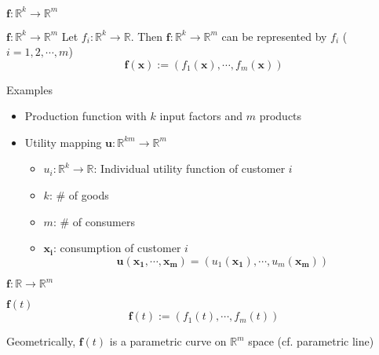 \documentclass[final]{beamer}
\begin{document}
\begin{frame}[t]{$\mathbf{f}:\mathbb{R}^k\rightarrow\mathbb{R}^m$}
	\begin{block}
		{$\mathbf{f}:\mathbb{R}^k\rightarrow\mathbb{R}^m$}
		Let $f_i: \mathbb{R}^k\rightarrow\mathbb{R}$. Then $\mathbf{f}:\mathbb{R}^k\rightarrow\mathbb{R}^m$ can be represented by $f_i$ ($i=1,2,\cdots,m$)
		\[
			\mathbf{f(x)}:=(f_1(\mathbf{x}),\cdots,f_m(\mathbf{x}))
		\]
	\end{block}
	\begin{block}
		{Examples}
		\begin{itemize}
			\item Production function with $k$ input factors and $m$ products
			\item Utility mapping $\mathbf{u}: \mathbb{R}^{km}\rightarrow\mathbb{R}^m$
			\begin{itemize}
				\item $u_i:\mathbb{R}^k\rightarrow\mathbb{R}$: Individual utility function of customer $i$
				\item $k$: \# of goods
				\item $m$: \# of consumers
				\item $\mathbf{x_i}$: consumption of customer $i$
				\[
					\mathbf{u}(\mathbf{x_1},\cdots,\mathbf{x_m})=(u_1(\mathbf{x_1}),\cdots,u_m(\mathbf{x_m}))
				\]
			\end{itemize}
		\end{itemize}
	\end{block}
\end{frame}
\begin{frame}[t]{$\mathbf{f}:\mathbb{R}\rightarrow\mathbb{R}^m$}
	\begin{block}
		{$\mathbf{f}(t)$}
		\[
			\mathbf{f}(t):=\left(f_1(t),\cdots,f_m(t)\right)
		\]
	\end{block}
	Geometrically, $\mathbf{f}(t)$ is a parametric curve on $\mathbb{R}^m$ space (cf. parametric line)
\end{frame}
\end{document}

